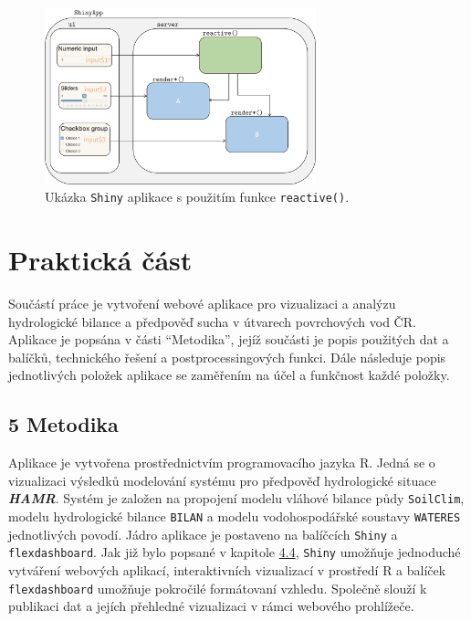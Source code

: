 \documentclass[12pt,]{article}
\begin{document}
\begin{figure}[H]
  \centering
      \includegraphics[width=0.7\textwidth]{fig/shiny}
      \caption{Ukázka \texttt{Shiny} aplikace s použitím funkce \texttt{reactive()}.} 
      \label{fig:ch4.4}
\end{figure}

\section*{Praktická část}\label{prakticka-cast}

\qquad Součástí práce je vytvoření webové aplikace pro vizualizaci a
analýzu hydrologické bilance a předpověď sucha v útvarech povrchových
vod ČR. Aplikace je popsána v části \enquote{Metodika}, jejíž součásti
je popis použitých dat a balíčků, technického řešení a
postprocessingových funkci. Dále následuje popis jednotlivých položek
aplikace se zaměřením na účel a funkčnost každé položky.

\subsection{5 Metodika}\label{metodika}

Aplikace je vytvořena prostřednictvím programovacího jazyka R. Jedná se
o vizualizaci výsledků modelování systému pro předpověď hydrologické
situace \textbf{\emph{HAMR}}. Systém je založen na propojení modelu
vláhové bilance půdy \texttt{SoilClim}, modelu hydrologické bilance
\texttt{BILAN} a modelu vodohospodářské soustavy \texttt{WATERES}
jednotlivých povodí. Jádro aplikace je postaveno na balíčcích
\texttt{Shiny} a \texttt{flexdashboard}. Jak již bylo popsané v kapitole
\protect\hyperlink{webviz}{4.4}, \texttt{Shiny} umožňuje jednoduché
vytváření webových aplikací, interaktivních vizualizací v prostředí R a
balíček \texttt{flexdashboard} umožňuje pokročilé formátovaní vzhledu.
Společně slouží k publikaci dat a jejích přehledné vizualizaci v rámci
webového prohlížeče.
\end{document}
